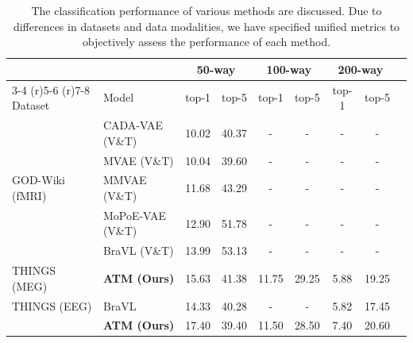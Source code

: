 \documentclass{article}
\begin{document}
\begin{table}[ht]
\centering
\caption{The classification performance of various methods are discussed. Due to differences in datasets and data modalities, we have specified unified metrics to objectively assess the performance of each method.}
\label{tab:decode_comparison}
\begin{tabular}{lllcccccc}
\toprule
& & \multicolumn{2}{c}{50-way} & \multicolumn{2}{c}{100-way} & \multicolumn{2}{c}{200-way} \\
 \cmidrule(r){3-4} \cmidrule(r){5-6} \cmidrule(r){7-8}
Dataset & Model & top-1 & top-5 & top-1 & top-5 & top-1 & top-5 \\
\midrule
\multirow{5}{*}{GOD-Wiki (fMRI)} 
& CADA-VAE (V\&T)\cite{schonfeld2019generalized} & 10.02 & 40.37 & - & - & - & - \\
& MVAE (V\&T) \cite{wu2018multimodal} & 10.04 & 39.60 & - & - & - & - \\
& MMVAE (V\&T) \cite{shi2019variational} & 11.68 & 43.29 & - & - & - & - \\
& MoPoE-VAE (V\&T) \cite{sutter2020generalized} & 12.90 & 51.78 & - & - & - & - \\
& BraVL (V\&T) \cite{du2023decoding} & 13.99 & 53.13 & - & - & - & - \\
\midrule

\multirow{1}{*}{THINGS (MEG)} 
& \textbf{ATM (Ours)} & 15.63 & 41.38 & 11.75 & 29.25 & 5.88 & 19.25\\
\midrule

\multirow{1}{*}{THINGS (EEG)} 
& BraVL \cite{du2023decoding} & 14.33 & 40.28 & - & - & 5.82 & 17.45\\
& \textbf{ATM (Ours)} & 17.40 & 39.40 & 11.50 & 28.50 & 7.40 & 20.60\\
\bottomrule

\end{tabular}
\end{table}
\end{document}
